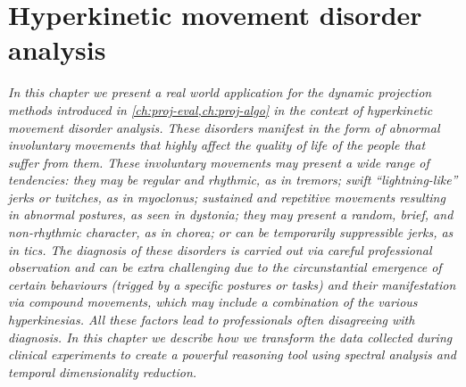 \chapter{Hyperkinetic movement disorder analysis}
\label{ch:nemo}

\textit{
In this chapter we present a real world application for the dynamic projection methods introduced in \cref{ch:proj-eval,ch:proj-algo} in the context of hyperkinetic movement disorder analysis. These disorders manifest in the form of abnormal involuntary movements that highly affect the quality of life of the people that suffer from them. These involuntary movements may present a wide range of tendencies: they may be regular and rhythmic, as in tremors; swift ``lightning-like'' jerks or twitches, as in myoclonus; sustained and repetitive movements resulting in abnormal postures, as seen in dystonia; they may present a random, brief, and non-rhythmic character, as in chorea; or can be temporarily suppressible jerks, as in tics.
The diagnosis of these disorders is carried out via careful professional observation and can be extra challenging due to the circunstantial emergence of certain behaviours (trigged by a specific postures or tasks) and their manifestation via compound movements, which may include a combination of the various hyperkinesias. All these factors lead to professionals often disagreeing with diagnosis. 
In this chapter we describe how we transform the data collected during clinical experiments to create a powerful reasoning tool using spectral analysis and temporal dimensionality reduction. 
}

\vspace{5mm} %


